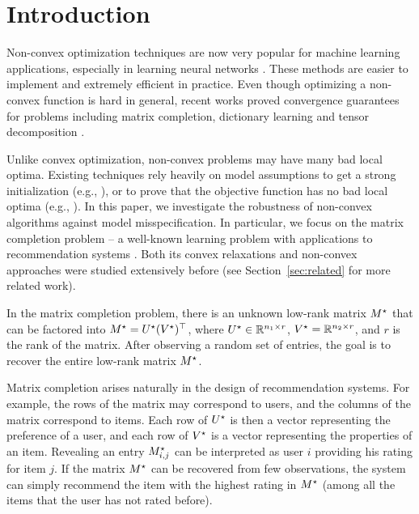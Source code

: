 
\section{Introduction}
\label{sec:intro}
Non-convex optimization techniques are now very popular for machine learning applications, especially in learning neural networks \citep{deepsurvey1,deepsurvey2}. These methods are easier to implement and extremely efficient in practice. %
Even though optimizing a non-convex function is hard in general, recent works proved convergence guarantees for problems including matrix completion, dictionary learning and tensor decomposition \citep{jain2013low, sun2015guaranteed,rgDict2,ge2015escaping}.

Unlike convex optimization, non-convex problems may have many bad local optima. Existing techniques rely heavily on model assumptions to get a strong initialization (e.g., \citep{jain2013low, sun2015guaranteed}), or to prove that the objective function has no bad local optima (e.g., \citep{ge2016matrix, GeJZ17}). In this paper, we investigate the robustness of non-convex algorithms against model misspecification. In particular, we focus on the matrix completion problem \--- a well-known learning problem with applications to recommendation systems \citep{koren2009bellkor,rennie2005fast}. Both its convex relaxations \citep{srebro2005rank,recht2011simpler} and non-convex approaches \citep{jain2013low, sun2015guaranteed,ge2016matrix} were studied extensively before (see Section~\ref{sec:related} for more related work).

In the matrix completion problem, there is an unknown low-rank matrix $M^\star$ that can be factored into $M^\star = U^\star(V^\star)^\top$, where $U^\star \in \mathbb{R}^{n_1\times r}$, $V^\star = \mathbb{R}^{n_2\times r}$, and $r$ is the rank of the matrix. %
After observing a random set of entries, the goal is to recover the entire low-rank matrix $M^\star$. %

Matrix completion arises naturally in the design of recommendation systems. For example, the rows of the matrix may correspond to users, and the columns of the matrix correspond to items. Each row of $U^\star$ is then a vector representing the preference of a user, and each row of $V^\star$ is a vector representing the properties of an item. Revealing an entry $M^\star_{i,j}$ can be interpreted as user $i$ providing his rating for item $j$. If the matrix $M^\star$ can be recovered from few observations, the system can simply recommend the item with the highest rating in $M^\star$ (among all the items that the user has not rated before).

